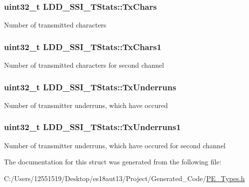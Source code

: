 \subsubsection[{Tx\+Chars}]{\setlength{\rightskip}{0pt plus 5cm}uint32\+\_\+t L\+D\+D\+\_\+\+S\+S\+I\+\_\+\+T\+Stats\+::\+Tx\+Chars}\label{struct_l_d_d___s_s_i___t_stats_abaff1182d41c2c211ce8da947df77bbd}
Number of transmitted characters \hypertarget{struct_l_d_d___s_s_i___t_stats_a0721d681a52cc566e4c89de10e962923}{}
\subsubsection[{Tx\+Chars1}]{\setlength{\rightskip}{0pt plus 5cm}uint32\+\_\+t L\+D\+D\+\_\+\+S\+S\+I\+\_\+\+T\+Stats\+::\+Tx\+Chars1}\label{struct_l_d_d___s_s_i___t_stats_a0721d681a52cc566e4c89de10e962923}
Number of transmitted characters for second channel \hypertarget{struct_l_d_d___s_s_i___t_stats_a5ac8911e76989013a9a4757a90aa5660}{}
\subsubsection[{Tx\+Underruns}]{\setlength{\rightskip}{0pt plus 5cm}uint32\+\_\+t L\+D\+D\+\_\+\+S\+S\+I\+\_\+\+T\+Stats\+::\+Tx\+Underruns}\label{struct_l_d_d___s_s_i___t_stats_a5ac8911e76989013a9a4757a90aa5660}
Number of transmitter underruns, which have occured \hypertarget{struct_l_d_d___s_s_i___t_stats_a14fb329147ead1d214cd25ffd3b39f6d}{}
\subsubsection[{Tx\+Underruns1}]{\setlength{\rightskip}{0pt plus 5cm}uint32\+\_\+t L\+D\+D\+\_\+\+S\+S\+I\+\_\+\+T\+Stats\+::\+Tx\+Underruns1}\label{struct_l_d_d___s_s_i___t_stats_a14fb329147ead1d214cd25ffd3b39f6d}
Number of transmitter underruns, which have occured for second channel 

The documentation for this struct was generated from the following file\+:\begin{DoxyCompactItemize}
\item 
C\+:/\+Users/12551519/\+Desktop/es18aut13/\+Project/\+Generated\+\_\+\+Code/\hyperlink{_p_e___types_8h}{P\+E\+\_\+\+Types.\+h}\end{DoxyCompactItemize}
